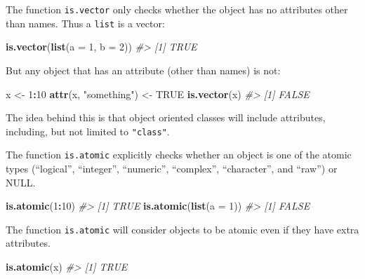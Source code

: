 \documentclass[]{book}
\newenvironment{Shaded}{\begin{snugshade}}{\end{snugshade}}
\newcommand{\CommentTok}[1]{\textcolor[rgb]{0.56,0.35,0.01}{\textit{#1}}}
\newcommand{\DataTypeTok}[1]{\textcolor[rgb]{0.13,0.29,0.53}{#1}}
\newcommand{\DecValTok}[1]{\textcolor[rgb]{0.00,0.00,0.81}{#1}}
\newcommand{\KeywordTok}[1]{\textcolor[rgb]{0.13,0.29,0.53}{\textbf{#1}}}
\newcommand{\NormalTok}[1]{#1}
\newcommand{\OperatorTok}[1]{\textcolor[rgb]{0.81,0.36,0.00}{\textbf{#1}}}
\newcommand{\OtherTok}[1]{\textcolor[rgb]{0.56,0.35,0.01}{#1}}
\newcommand{\StringTok}[1]{\textcolor[rgb]{0.31,0.60,0.02}{#1}}
\theoremstyle{plain}
\theoremstyle{remark}
\theoremstyle{definition}
\theoremstyle{definition}
\theoremstyle{definition}
\theoremstyle{remark}
\begin{document}
The function \texttt{is.vector} only checks whether the object has no
attributes other than names. Thus a \texttt{list} is a vector:

\begin{Shaded}
\begin{Highlighting}[]
\KeywordTok{is.vector}\NormalTok{(}\KeywordTok{list}\NormalTok{(}\DataTypeTok{a =} \DecValTok{1}\NormalTok{, }\DataTypeTok{b =} \DecValTok{2}\NormalTok{))}
\CommentTok{#> [1] TRUE}
\end{Highlighting}
\end{Shaded}

But any object that has an attribute (other than names) is not:

\begin{Shaded}
\begin{Highlighting}[]
\NormalTok{x <-}\StringTok{ }\DecValTok{1}\OperatorTok{:}\DecValTok{10}
\KeywordTok{attr}\NormalTok{(x, }\StringTok{"something"}\NormalTok{) <-}\StringTok{ }\OtherTok{TRUE}
\KeywordTok{is.vector}\NormalTok{(x)}
\CommentTok{#> [1] FALSE}
\end{Highlighting}
\end{Shaded}

The idea behind this is that object oriented classes will include
attributes, including, but not limited to \texttt{"class"}.

The function \texttt{is.atomic} explicitly checks whether an object is
one of the atomic types (``logical'', ``integer'', ``numeric'',
``complex'', ``character'', and ``raw'') or NULL.

\begin{Shaded}
\begin{Highlighting}[]
\KeywordTok{is.atomic}\NormalTok{(}\DecValTok{1}\OperatorTok{:}\DecValTok{10}\NormalTok{)}
\CommentTok{#> [1] TRUE}
\KeywordTok{is.atomic}\NormalTok{(}\KeywordTok{list}\NormalTok{(}\DataTypeTok{a =} \DecValTok{1}\NormalTok{))}
\CommentTok{#> [1] FALSE}
\end{Highlighting}
\end{Shaded}

The function \texttt{is.atomic} will consider objects to be atomic even
if they have extra attributes.

\begin{Shaded}
\begin{Highlighting}[]
\KeywordTok{is.atomic}\NormalTok{(x)}
\CommentTok{#> [1] TRUE}
\end{Highlighting}
\end{Shaded}
\end{document}
